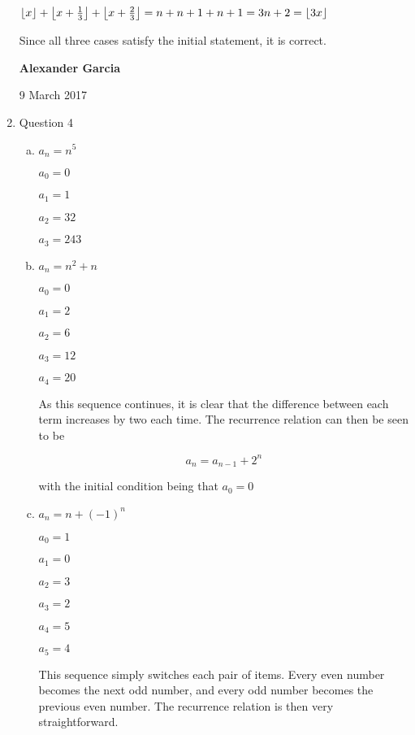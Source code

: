 \documentclass[11pt]{article}
\DeclarePairedDelimiter\floor{\lfloor}{\rfloor}
\begin{document}
\begin{enumerate}
\begin{tabular}{ll}
		\end{tabular}

		$\floor*{x} + \floor*{x + \frac{1}{3}} +
		\floor*{x + \frac{2}{3}} = n + n + 1 + n + 1 =
		3n + 2 = \floor*{3x}$

		Since all three cases satisfy the initial statement,
		it is correct. \\

		\newpage

		\textbf{Alexander Garcia}

		9 March 2017 \\

	\item Question 4

		\begin{enumerate}[(a)]

			\item $a_n = n^5$

				$a_0 = 0$

				$a_1 = 1$

				$a_2 = 32$

				$a_3 = 243$ \\

			\item $a_n = n^2 + n$

				$a_0 = 0$

				$a_1 = 2$

				$a_2 = 6$

				$a_3 = 12$

				$a_4 = 20$

				As this sequence continues, it is clear that the difference between
				each term increases by two each time. The recurrence relation can
				then be seen to be

				$$a_n = a_{n-1} + 2^n$$

				with the initial condition being that $a_0 = 0$\\

			\item $a_n = n + (-1)^n$

				$a_0 = 1$

				$a_1 = 0$

				$a_2 = 3$

				$a_3 = 2$

				$a_4 = 5$

				$a_5 = 4$

				This sequence simply switches each pair of items. Every even number
				becomes the next odd number, and every odd number becomes the
				previous even number. The recurrence relation is then very
				straightforward.


\end{enumerate}
\end{enumerate}
\end{document}
